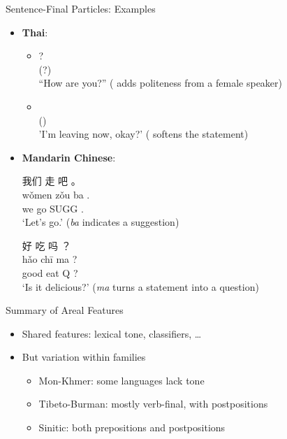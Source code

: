 \documentclass{beamer}
\begin{document}
\begin{frame}{Sentence-Final Particles: Examples}
  \begin{itemize}
  \item \textbf{Thai}:
    \begin{itemize}
    \item {}? \\
      (?) \\
      ``How are you?'' ( adds politeness from a female speaker)
    \item {} \\
      () \\
      'I'm leaving now, okay?' ( softens the statement)
    \end{itemize}
  \item \textbf{Mandarin Chinese}:
    \begin{exe}
      \ex \gll 我们 走 吧 。\\
      wǒmen zǒu ba .\\
      we go SUGG .\\
      \trans `Let's go.' (\textit{ba} indicates a suggestion)
      
      \ex \gll 好 吃 吗 ？\\
      hǎo chī ma ? \\
      good eat Q ? \\
      \trans `Is it delicious?' (\textit{ma} turns a statement into a question)
    \end{exe}
  \end{itemize}
\end{frame}

\begin{frame}{Summary of Areal Features}
    \begin{itemize}
        \item Shared features: lexical tone, classifiers, \ldots
        \item But variation within families
          \begin{itemize}
          \item Mon-Khmer: some languages lack tone
          \item Tibeto-Burman: mostly verb-final, with postpositions
          \item Sinitic: both prepositions and postpositions
          \end{itemize}
    \end{itemize}
\end{frame}
\end{document}
